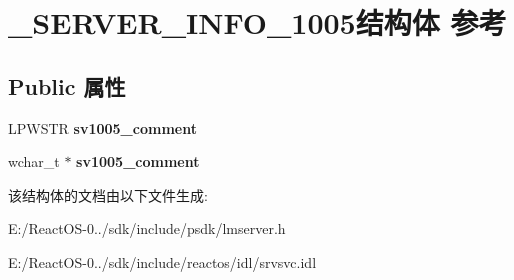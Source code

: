 \hypertarget{struct___s_e_r_v_e_r___i_n_f_o__1005}{}\section{\+\_\+\+S\+E\+R\+V\+E\+R\+\_\+\+I\+N\+F\+O\+\_\+1005结构体 参考}
\label{struct___s_e_r_v_e_r___i_n_f_o__1005}
\subsection*{Public 属性}
\begin{DoxyCompactItemize}
\item 
\mbox{\label{struct___s_e_r_v_e_r___i_n_f_o__1005_a65f2f244c0527b7823f447f2ec2d27ee}} 
L\+P\+W\+S\+TR {\bfseries sv1005\+\_\+comment}
\item 
\mbox{\label{struct___s_e_r_v_e_r___i_n_f_o__1005_a689e66bd239caad16bdbb01d88fd2611}} 
wchar\+\_\+t $\ast$ {\bfseries sv1005\+\_\+comment}
\end{DoxyCompactItemize}


该结构体的文档由以下文件生成\+:\begin{DoxyCompactItemize}
\item 
E\+:/\+React\+O\+S-\/0../sdk/include/psdk/lmserver.\+h\item 
E\+:/\+React\+O\+S-\/0../sdk/include/reactos/idl/srvsvc.\+idl\end{DoxyCompactItemize}
